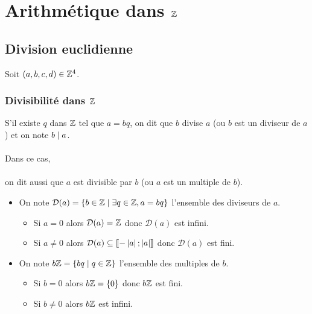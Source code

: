 \chapter{Arithmétique dans \(\mathbb{Z}\)}

\minitoc

\section{Division euclidienne}
Soit \((a, b, c, d) \in \mathbb{Z}^4\).
\subsection{Divisibilité dans \(\mathbb{Z}\)}
\begin{defi}
    S’il existe \(q\) dans \(\mathbb{Z}\) tel que \(a = bq\), on dit que \(b\) divise \(a\) (ou \(b\) est un diviseur de \(a\)) et on note \(b \mid a\).\\~\\
    Dans ce cas,\\~\\
    on dit aussi que \(a\) est divisible par \(b\) (ou \(a\) est un multiple de \(b\)).
\end{defi}

\begin{defprop}
    \begin{itemize}
        \item On note \(\mathcal{D}(a) = \left\lbrace b \in \mathbb{Z} \;\middle|\; \exists q \in \mathbb{Z}, a = bq\right\rbrace\) l’ensemble des diviseurs de \(a\).
        \begin{itemize}
            \item Si \(a = 0\) alors \(\mathcal{D}(a) = \mathbb{Z}\) donc \(\mathcal{D}(a)\) est infini.
            \item Si \(a \neq 0\) alors \(\mathcal{D}(a) \subseteq \left\llbracket-\left\lvert a\right\rvert;\left\lvert a\right\rvert\right\rrbracket \) donc \(\mathcal{D}(a)\) est fini.
        \end{itemize}
        \item On note \(b\mathbb{Z} = \left\lbrace bq \;\middle|\; q \in \mathbb{Z}\right\rbrace\) l’ensemble des multiples de \(b\).
        \begin{itemize}
            \item Si \(b = 0\) alors \(b\mathbb{Z} = \left\lbrace0\right\rbrace\) donc \(b\mathbb{Z}\) est fini.
            \item Si \(b \neq 0\) alors \(b\mathbb{Z}\) est infini.
        \end{itemize}
    \end{itemize}
\end{defprop}

